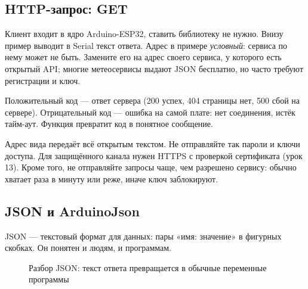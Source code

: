 \subsection{HTTP-запрос: GET}

Клиент  входит в ядро Arduino-ESP32, ставить библиотеку не нужно. Внизу пример выводит
в Serial текст ответа. Адрес в примере \emph{условный}: сервиса по нему может не быть. Замените его на
адрес своего сервиса, у которого есть открытый API; многие метеосервисы выдают JSON бесплатно, но часто
требуют регистрации и ключ.


Положительный код --- ответ сервера (200 успех, 404 страницы нет, 500 сбой на сервере). Отрицательный
код --- ошибка на самой плате: нет соединения, истёк тайм-аут. Функция 
превратит код в понятное сообщение.

\begin{caution}
Адрес вида  передаёт всё открытым текстом. Не отправляйте так пароли и ключи доступа.
Для защищённого канала нужен HTTPS с проверкой сертификата (урок 13). Кроме того, не отправляйте запросы
чаще, чем разрешено сервису: обычно хватает раза в минуту или реже, иначе ключ заблокируют.
\end{caution}

\subsection{JSON и ArduinoJson}

JSON --- текстовый формат для данных: пары «имя: значение» в фигурных скобках. Он понятен и людям, и
программам.
\begin{figure}[H]
\centering
{}
\caption{Разбор JSON: текст ответа превращается в обычные переменные программы}
\end{figure}

